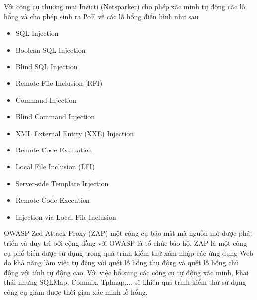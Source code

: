 \documentclass[./../main.tex]{subfiles}
\begin{document}
Với công cụ thương mại Invicti (Netsparker) cho phép xác minh tự động các lỗ hổng
và cho phép sinh ra PoE về các lỗ hổng điển hình như sau
\begin{itemize}
	\item SQL Injection
	\item Boolean SQL Injection
	\item Blind SQL Injection
	\item Remote File Inclusion (RFI)
	\item Command Injection
	\item Blind Command Injection
	\item XML External Entity (XXE) Injection
	\item Remote Code Evaluation
	\item Local File Inclusion (LFI)
	\item Server-side Template Injection
	\item Remote Code Execution
	\item Injection via Local File Inclusion
\end{itemize}

OWASP Zed Attack Proxy (ZAP) một công cụ bảo mật mã nguồn mở được phát triển và duy trì bởi cộng đồng với OWASP là tổ chức bảo hộ. ZAP là một công cụ phổ biến được sử dụng trong quá trình kiểm thử xâm nhập các ứng dụng Web do khả năng làm việc tự động với quét lỗ hổng thụ động và quét lỗ hổng chủ động với tính tự động cao. Với việc bổ sung các công cụ tự động xác minh, khai thái nhưng SQLMap, Commix, Tplmap,... sẽ khiển quá trình kiểm thử sử dụng công cụ giảm được thời gian xác minh lỗ hổng.
\end{document}
